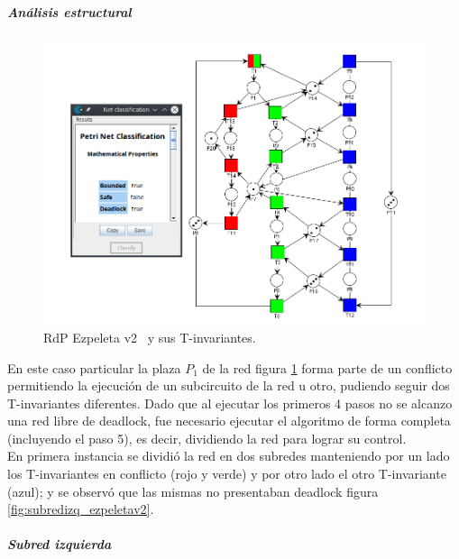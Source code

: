\subparagraph{Análisis estructural}
\hfill 
\begin{figure}[H]
	\centering
	\includegraphics[width=\textwidth]{Figures/algoritmo3/ezpeletav21.png}
	\caption[RdP Ezpeleta v2 y sus T-invariantes.]{RdP Ezpeleta v2 \footnotemark \ y sus T-invariantes.}
	\label{fig:ezpeletav2_T-invariantes}
 \end{figure} 
\bigskip

En este caso particular la plaza $P_1$ de la red figura \ref{fig:ezpeletav2_T-invariantes} forma parte de un conflicto permitiendo la ejecución de un subcircuito de la red u otro, pudiendo seguir dos T-invariantes diferentes.
Dado que al ejecutar los primeros 4 pasos no se alcanzo una red libre de deadlock, fue necesario ejecutar el algoritmo de forma completa (incluyendo el paso 5), es decir, dividiendo la red para lograr su control. \\
En primera instancia se dividió la red en dos subredes manteniendo por un lado los T-invariantes en conflicto (rojo y verde) y por otro lado el otro T-invariante (azul); y se observó que las mismas no presentaban deadlock figura \ref{fig:subredizq_ezpeletav2}.

\newpage
\subparagraph{Subred izquierda}
\hfill
\bigskip

